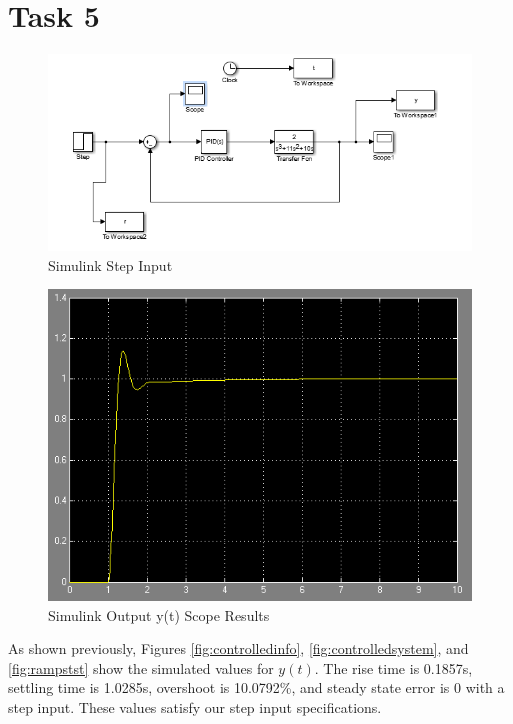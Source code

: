 \documentclass[12pt,letter]{article}
\begin{document}
\section*{Task 5}
\begin{figure}[H]
\centering
\includegraphics[width=1\linewidth]{"simulink step input"}
\caption{Simulink Step Input}
\label{fig:simulinkstepinput}
\end{figure}
\begin{figure}[H]
\centering
\includegraphics[width=.8\linewidth]{simulinkscope}
\caption{Simulink Output y(t) Scope Results}
\label{fig:simulinkscope}
\end{figure}

As shown previously, Figures \ref{fig:controlledinfo}, \ref{fig:controlledsystem}, and \ref{fig:rampstst} show the simulated values for $y(t)$.
The rise time is 0.1857s, settling time is 1.0285s, overshoot is 10.0792\%, and steady state error is 0 with a step input. These values satisfy our step input specifications.
\end{document}
